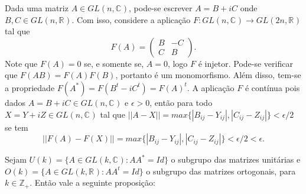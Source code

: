 \documentclass[12pt]{book}
\newcommand{\complexo}[1]{\mathbb{C}^{#1}}
\newcommand{\generalgroup}[2]{GL(#1, #2)}
\newcommand{\generalgroupreal}[1]{\generalgroup{#1}{\real{}}}
\newcommand{\generalgroupcomplexo}[1]{\generalgroup{#1}{\complexo{}}}
\newcommand{\inteiros}{\mathbb{Z}}
\newcommand{\matrizortogonal}[1]{O(#1)}
\newcommand{\matrizunitaria}[1]{U(#1)}
\newcommand{\real}[1]{\mathbb{R}^{#1}}
\begin{document}
	Dada uma matriz $A \in \generalgroupcomplexo{n}$, pode-se escrever $A = B+iC$ onde $B,C \in \generalgroupreal{n}$. Com isso, considere a aplicação $F:\generalgroupcomplexo{n} \to \generalgroupreal{2n}$ tal que 
	$$
	F(A)=
	\left(
	\begin{array}{cc}
	B & -C
	\\
	C & B
	\end{array}
	\right).
	$$
	Note que $F(A) = 0$ se, e somente se, $A=0$, logo $F$ é injetor. Pode-se verificar que $F(AB)=F(A)F(B)$, portanto é um monomorfismo. Além disso, tem-se a propriedade $F(A^{*}) = F(B^{t} - iC^{t}) = F(A)^{t}$. A aplicação $F$ é contínua pois dados $A=B+iC \in \generalgroupcomplexo{n}$ e $\epsilon > 0$, então para todo $X= Y+iZ \in \generalgroupcomplexo{n}$ tal que $||A - X||=max \{|B_{ij} - Y_{ij}|,  |C_{ij} - Z_{ij}|\} < \epsilon/2$ se tem 
	$$
	||F(A) - F(X)|| = max \{|B_{ij} - Y_{ij}|, |C_{ij} - Z_{ij}| \}< \epsilon/2 < \epsilon.
	$$
	
	Sejam $\matrizunitaria{k} = \{A\in \generalgroupcomplexo{k}: AA^{*}=Id \}$ o subgrupo das matrizes unitárias e $\matrizortogonal{k} = \{A \in \generalgroupreal{k}: AA^{t}  =Id \}$ o subgrupo das matrizes ortogonais, para $k\in \inteiros_{+}$. Então vale a seguinte proposição:
	
\end{document}
